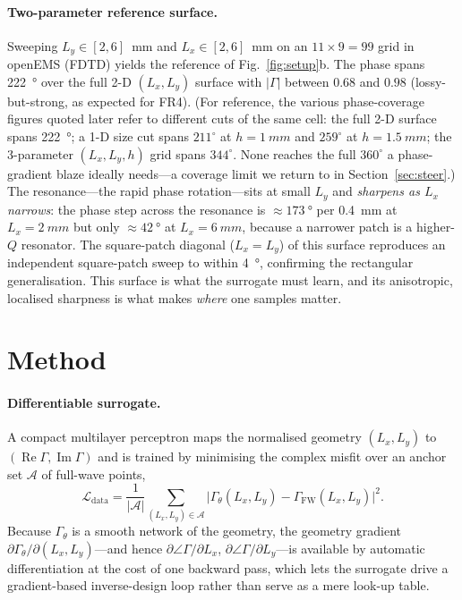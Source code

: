 \documentclass[11pt]{article}
\begin{document}
\paragraph{Two-parameter reference surface.} Sweeping $L_y\in[2,6]$~mm and $L_x\in[2,6]$~mm on an
$11\times9=99$ grid in openEMS (FDTD) yields the reference of Fig.~\ref{fig:setup}b. The phase spans
\SI{222}{\degree} over the full 2-D $(L_x,L_y)$ surface with $|\Gamma|$ between $0.68$ and $0.98$
(lossy-but-strong, as expected for FR4). (For reference, the various phase-coverage figures quoted later
refer to different cuts of the same cell: the full 2-D surface spans \SI{222}{\degree}; a 1-D size cut spans
$211^\circ$ at $h\!=\!\SI{1}{mm}$ and $259^\circ$ at $h\!=\!\SI{1.5}{mm}$; the 3-parameter $(L_x,L_y,h)$ grid
spans $344^\circ$. None reaches the full $360^\circ$ a phase-gradient blaze ideally needs---a coverage
limit we return to in Section~\ref{sec:steer}.) The
resonance---the rapid phase rotation---sits at small $L_y$ and \emph{sharpens as $L_x$ narrows}: the
phase step across the resonance is $\approx\!\SI{173}{\degree}$ per \SI{0.4}{mm} at $L_x=\SI{2}{mm}$ but
only $\approx\!\SI{42}{\degree}$ at $L_x=\SI{6}{mm}$, because a narrower patch is a higher-$Q$ resonator.
The square-patch diagonal ($L_x=L_y$) of this surface reproduces an independent square-patch sweep to
within \SI{4}{\degree}, confirming the rectangular generalisation. This surface is what the
surrogate must learn, and its anisotropic, localised sharpness is what makes \emph{where} one
samples matter.

\section{Method}\label{sec:method}
\paragraph{Differentiable surrogate.} A compact multilayer perceptron maps the normalised geometry
$(L_x,L_y)$ to $(\operatorname{Re}\Gamma,\operatorname{Im}\Gamma)$ and is trained by minimising the
complex misfit over an anchor set $\mathcal{A}$ of full-wave points,
\begin{equation}
\mathcal{L}_\mathrm{data}=\frac{1}{|\mathcal{A}|}\sum_{(L_x,L_y)\in\mathcal{A}}
\big|\Gamma_\theta(L_x,L_y)-\Gamma_\mathrm{FW}(L_x,L_y)\big|^2 .
\label{eq:data}
\end{equation}
Because $\Gamma_\theta$ is a smooth network of the geometry, the geometry gradient
$\partial\Gamma_\theta/\partial(L_x,L_y)$---and hence $\partial\angle\Gamma/\partial L_x$,
$\partial\angle\Gamma/\partial L_y$---is available by automatic differentiation at the cost of one
backward pass, which lets the surrogate drive a gradient-based inverse-design loop
rather than serve as a mere look-up table.
\end{document}
